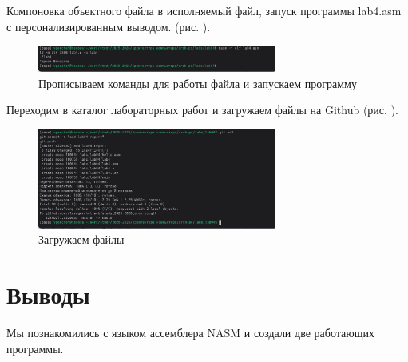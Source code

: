 \documentclass[
  12pt,
  a4paper,
  DIV=11,
  numbers=noendperiod]{scrreprt}
\begin{document}
Компоновка объектного файла в исполняемый файл, запуск программы
lab4.asm с персонализированным выводом. (рис. \textcite{fig:010}).

\begin{figure}

{\centering \includegraphics[width=0.7\textwidth,height=\textheight]{image/10.png}

}

\caption{Прописываем команды для работы файла и запускаем программу}

\end{figure}%

Переходим в каталог лабораторных работ и загружаем файлы на Github (рис.
\textcite{fig:011}).

\begin{figure}

{\centering \includegraphics[width=0.7\textwidth,height=\textheight]{image/11.png}

}

\caption{Загружаем файлы}

\end{figure}%

\chapter{Выводы}\label{ux432ux44bux432ux43eux434ux44b}

Мы познакомились с языком ассемблера NASM и создали две работающих
программы.


\printbibliography
\end{document}

